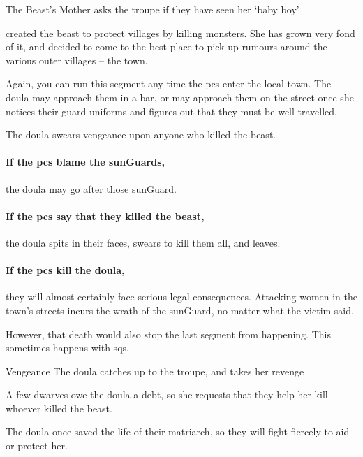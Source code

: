 \begin{multicols}{2}
{The Beast's Mother}%
{ asks the troupe if they have seen her `baby boy'}%

\begin{exampletext}
   created the beast to protect \glspl{village} by killing monsters.
  She has grown very fond of it, and decided to come to the best place to pick up rumours around the various outer \glspl{village} -- the town.
\end{exampletext}

Again, you can run this \gls{segment} any time the \glspl{pc} enter the local town.
The \gls{doula} may approach them in a bar, or may approach them on the street once she notices their \gls{guard} uniforms and figures out that they must be well-travelled.

The \gls{doula} swears vengeance upon anyone who killed the beast.

\paragraph{If the \glspl{pc} blame the \glspl{sunGuard},}
the \gls{doula} may go after those \gls{sunGuard}.

\paragraph{If the \glspl{pc} say that they killed the beast,}
the \gls{doula} spits in their faces, swears to kill them all, and leaves.

\paragraph{If the \glspl{pc} kill the \gls{doula},}
they will almost certainly face serious legal consequences.
Attacking women in the town's streets incurs the wrath of the \gls{sunGuard}, no matter what the victim said.

However, that death would also stop the last \gls{segment} from happening.
This sometimes happens with \glspl{sq}.

{Vengeance}%
{The \gls{doula} catches up to the troupe, and takes her revenge}%

\begin{exampletext}
  A few dwarves owe the \gls{doula} a debt, so she requests that they help her kill whoever killed the beast.

  The \gls{doula} once saved the life of their matriarch, so they will fight fiercely to aid or protect her.
\end{exampletext}


\end{multicols}
